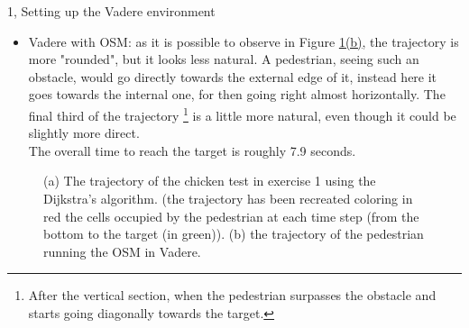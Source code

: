 \documentclass[10pt,a4paper]{article}
\begin{document}
\begin{task}{1, Setting up the Vadere environment}
\begin{itemize}
    \item Vadere with OSM: as it is possible to observe in Figure \hyperref[fig:chicken-test]{\ref{fig:chicken-test}(b)}, the trajectory is more "rounded", but it looks less natural.
    A pedestrian, seeing such an obstacle, would go directly towards the external edge of it, instead here it goes towards the internal one, for then going right almost horizontally.
    The final third of the trajectory
    \footnote{After the vertical section, when the pedestrian surpasses the obstacle and starts going diagonally towards the target.}
    is a little more natural, even though it could be slightly more direct.\\
    The overall time to reach the target is roughly 7.9 seconds.
\end{itemize}

\begin{figure}[H]
    \centering
    \hfill
    \caption{(a) The trajectory of the chicken test in exercise 1 using the Dijkstra's algorithm. (the trajectory has been recreated coloring in red the cells occupied by the pedestrian at each time step (from the bottom to the target (in green)). (b) the trajectory of the pedestrian running the OSM in Vadere.}
    \label{fig:chicken-test}
\end{figure}


\end{task}
\end{document}
